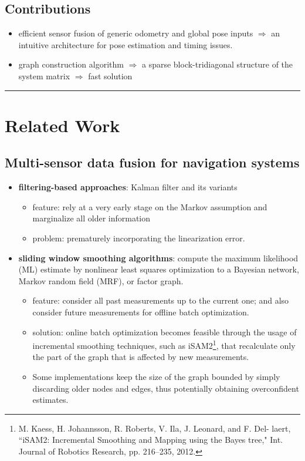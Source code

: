 \documentclass[letterpaper,10pt]{article}
\begin{document}
\subsection{Contributions}

\begin{itemize}
	\item efficient sensor fusion of generic odometry and global pose inputs $\Rightarrow$ an intuitive architecture for pose estimation and timing issues.
	\item graph construction algorithm $\Rightarrow$ a sparse block-tridiagonal structure of the system matrix $\Rightarrow$ fast solution
\end{itemize}

\begin{center}\rule{\textwidth}{1pt}\end{center}
\section{Related Work}

\subsection{Multi-sensor data fusion for navigation systems}

\begin{itemize}
	\item \textbf{filtering-based approaches}: Kalman filter and its variants
	\begin{itemize}
		\item feature: rely at a very early stage on the Markov assumption and marginalize all older information
		\item problem: prematurely incorporating the linearization error.
	\end{itemize}
	\item \textbf{sliding window smoothing algorithms}: compute the maximum likelihood (ML) estimate by nonlinear least squares optimization to a Bayesian network, Markov random field (MRF), or factor graph.
	\begin{itemize}
		\item feature: consider all past measurements up to the current one; and also consider future measurements for offline batch optimization.
		\item solution: online batch optimization becomes feasible through the usage of incremental smoothing techniques, such as iSAM2\footnote{M. Kaess, H. Johannsson, R. Roberts, V. Ila, J. Leonard, and F. Del- laert, ``iSAM2: Incremental Smoothing and Mapping using the Bayes tree," Int. Journal of Robotics Research, pp. 216–235, 2012.}, that recalculate only the part of the graph that is affected by new measurements.
		\item Some implementations keep the size of the graph bounded by simply discarding older nodes and edges, thus potentially obtaining overconfident estimates.
	\end{itemize}
\end{itemize}
\end{document}
